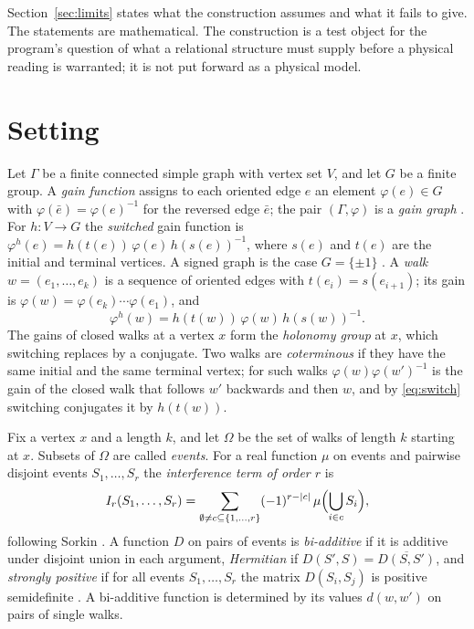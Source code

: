 Section~\ref{sec:limits} states what the construction assumes and what it fails to give. The statements are mathematical. The construction is a test object for the program's question of what a relational structure must supply before a physical reading is warranted; it is not put forward as a physical model.

\section{Setting}\label{sec:setting}

Let $\Gamma$ be a finite connected simple graph with vertex set $V$, and let $G$ be a finite group. A \emph{gain function} assigns to each oriented edge $e$ an element $\varphi(e)\in G$ with $\varphi(\bar e)=\varphi(e)^{-1}$ for the reversed edge $\bar e$; the pair $(\Gamma,\varphi)$ is a \emph{gain graph} \cite{zaslavsky,reff}. For $h\colon V\to G$ the \emph{switched} gain function is $\varphi^h(e)=h(t(e))\,\varphi(e)\,h(s(e))^{-1}$, where $s(e)$ and $t(e)$ are the initial and terminal vertices. A signed graph is the case $G=\{\pm1\}$ \cite{g3}. A \emph{walk} $w=(e_1,\dots,e_k)$ is a sequence of oriented edges with $t(e_i)=s(e_{i+1})$; its gain is $\varphi(w)=\varphi(e_k)\cdots\varphi(e_1)$, and
\begin{equation}\label{eq:switch}
\varphi^h(w)=h(t(w))\,\varphi(w)\,h(s(w))^{-1}.
\end{equation}
The gains of closed walks at a vertex $x$ form the \emph{holonomy group} at $x$, which switching replaces by a conjugate. Two walks are \emph{coterminous} if they have the same initial and the same terminal vertex; for such walks $\varphi(w)\varphi(w')^{-1}$ is the gain of the closed walk that follows $w'$ backwards and then $w$, and by \eqref{eq:switch} switching conjugates it by $h(t(w))$.

Fix a vertex $x$ and a length $k$, and let $\Omega$ be the set of walks of length $k$ starting at $x$. Subsets of $\Omega$ are called \emph{events}. For a real function $\mu$ on events and pairwise disjoint events $S_1,\dots,S_r$ the \emph{interference term of order $r$} is
\[
I_r(S_1,\dots,S_r)=\sum_{\emptyset\ne c\subseteq\{1,\dots,r\}}(-1)^{r-|c|}\,\mu\Bigl(\bigcup_{i\in c}S_i\Bigr),
\]
following Sorkin \cite{sorkin}. A function $D$ on pairs of events is \emph{bi-additive} if it is additive under disjoint union in each argument, \emph{Hermitian} if $D(S',S)=\overline{D(S,S')}$, and \emph{strongly positive} if for all events $S_1,\dots,S_r$ the matrix $D(S_i,S_j)$ is positive semidefinite \cite{djs}. A bi-additive function is determined by its values $d(w,w')$ on pairs of single walks.


